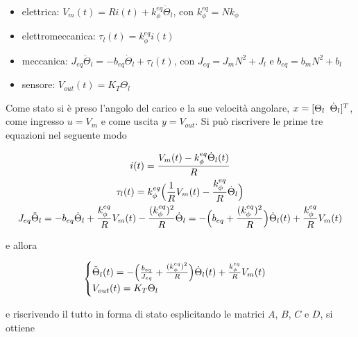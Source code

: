 	\begin{itemize}
		\item elettrica: $V_m(t)=Ri(t)+k_{\phi}^{eq}\dot{\Theta}_l$, con $k_{\phi}^{eq}=Nk_{\phi}$
		\item elettromeccanica: $\tau_l(t)=k_{\phi}^{eq}i(t)$
		\item meccanica: $J_{eq}\ddot{\Theta}_l=-b_{eq}\dot{\Theta}_l+\tau_l(t)$, con $J_{eq}=J_mN^2+J_l$ e $b_{eq}=b_mN^2+b_l$
		\item sensore: $V_{out}(t)=K_T\Theta_l$
	\end{itemize}  
		
	\noindent Come stato si è preso l'angolo del carico e la sue velocità angolare, $x=[\Theta_l \singleSpacing \dot{\Theta}_l]^T$, come ingresso $u=V_m$ e come uscita $y=V_{out}$. Si può riscrivere le prime tre equazioni nel seguente modo
		
	\begin{gather}
		i(t)=\frac{V_m(t)-k_{\phi}^{eq}\dot{\Theta}_l(t)}{R} \\
		\tau_l(t)=k_{\phi}^{eq}\Bigl(\frac{1}{R}V_m(t)-\frac{k_{\phi}^{eq}}{R}\dot{\Theta}_l\Bigl) \\
		J_{eq}\ddot{\Theta}_l=-b_{eq}\dot{\Theta}_l+\frac{k_{\phi}^{eq}}{R}V_m(t)-\frac{(k_{\phi}^{eq})^2}{R}\dot{\Theta}_l=-\Bigl(b_{eq}+\frac{(k_{\phi}^{eq})^2}{R}\Bigl)\dot{\Theta}_l(t)+\frac{k_{\phi}^{eq}}{R}V_m(t)
	\end{gather}  
		
	\noindent e allora
		
	\begin{equation}
		\begin{cases}
			\ddot{\Theta}_l(t)=-\Bigl(\frac{b_{eq}}{J_{eq}}+\frac{(k_{\phi}^{eq})^2}{R}\Bigl)\dot{\Theta}_l(t)+\frac{k_{\phi}^{eq}}{R}V_m(t) \\
			V_{out}(t)=K_T\Theta_l
		\end{cases}
	\end{equation}
		
	\noindent e riscrivendo il tutto in forma di stato esplicitando le matrici $A$, $B$, $C$ e $D$, si ottiene
		
